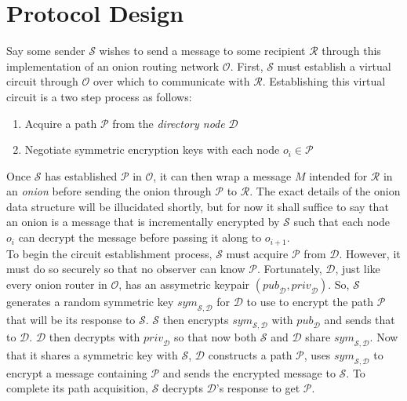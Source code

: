 \documentclass[10pt]{report}
\begin{document}
\section{Protocol Design}
Say some sender $\mathcal{S}$ wishes to send a message to some recipient $\mathcal{R}$
through this implementation of an onion routing network $\mathcal{O}$.  First, $\mathcal{S}$
must establish a virtual circuit through $\mathcal{O}$ over which to communicate with
$\mathcal{R}$.  Establishing this virtual circuit is a two step process as follows:
\begin{enumerate}
    \item Acquire a path $\mathcal{P}$ from the \textit{directory node} $\mathcal{D}$
    \item Negotiate symmetric encryption keys with each node $o_i \in \mathcal{P}$
\end{enumerate}
Once $\mathcal{S}$ has established $\mathcal{P}$ in $\mathcal{O}$, it can then wrap a message $M$
intended for $\mathcal{R}$ in an \textit{onion} before sending the onion through $\mathcal{P}$ to
$\mathcal{R}$.  The exact details of the onion data structure will be illucidated shortly, but for
now it shall suffice to say that an onion is a message that is incrementally encrypted by $\mathcal{S}$
such that each node $o_i$ can decrypt the message before passing it along to $o_{i+1}$.\\

To begin the circuit establishment process, $\mathcal{S}$ must acquire $\mathcal{P}$ from
$\mathcal{D}$.  However, it must do so securely so that no observer can know $\mathcal{P}$.
Fortunately, $\mathcal{D}$, just like every onion router in $\mathcal{O}$, has an assymetric
keypair $(\mathit{pub}_\mathcal{D}, \mathit{priv}_\mathcal{D})$.  So, $\mathcal{S}$ generates a
random symmetric key $\mathit{sym}_{\mathcal{S},\mathcal{D}}$ for $\mathcal{D}$ to use to encrypt
the path $\mathcal{P}$ that will be its response to $\mathcal{S}$.  $\mathcal{S}$ then encrypts
$\mathit{sym}_{\mathcal{S},\mathcal{D}}$ with $\mathit{pub}_\mathcal{D}$ and sends that to
$\mathcal{D}$.  $\mathcal{D}$ then decrypts with $\mathit{priv}_\mathcal{D}$ so that now both
$\mathcal{S}$ and $\mathcal{D}$ share $\mathit{sym}_{\mathcal{S},\mathcal{D}}$.  Now that it shares
a symmetric key with $\mathcal{S}$, $\mathcal{D}$ constructs a path $\mathcal{P}$, uses
$\mathit{sym}_{\mathcal{S},\mathcal{D}}$ to encrypt a message containing $\mathcal{P}$ and sends
the encrypted message to $\mathcal{S}$.  To complete its path acquisition, $\mathcal{S}$ decrypts
$\mathcal{D}$'s response to get $\mathcal{P}$.\\
\end{document}
